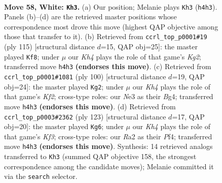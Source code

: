 \documentclass[11pt]{article}
\begin{document}
\clearpage

\begin{figure}[p]\centering
\begin{subfigure}{0.46\textwidth}\centering
\resizebox{\linewidth}{!}{%
\newchessgame
\chessboard[
  setfen={7k/1r4b1/6R1/8/2P4K/4N3/R7/8 w - - 36 58},
  showmover=false,
  pgfstyle=straightmove, color=movearrow, markmove={h4-h3}
]}
\caption{}
\end{subfigure}\hfill
\begin{subfigure}{0.46\textwidth}\centering
\resizebox{\linewidth}{!}{%
\newchessgame
\chessboard[
  setfen={8/6k1/1p1rB3/5K2/8/8/8/R7 b - - 6 58},
  showmover=false,
  pgfstyle=straightmove, color=movearrow, markmove={g7-f8}
]}
\caption{}
\end{subfigure}
\\[4pt]
\begin{subfigure}{0.46\textwidth}\centering
\resizebox{\linewidth}{!}{%
\newchessgame
\chessboard[
  setfen={8/8/5k2/3Rb3/r5B1/7P/5K2/8 w - - 11 51},
  showmover=false,
  pgfstyle=straightmove, color=movearrow, markmove={f2-g2}
]}
\caption{}
\end{subfigure}\hfill
\begin{subfigure}{0.46\textwidth}\centering
\resizebox{\linewidth}{!}{%
\newchessgame
\chessboard[
  setfen={R7/8/5k2/8/5p2/Br6/8/K7 b - - 6 62},
  showmover=false,
  pgfstyle=straightmove, color=movearrow, markmove={f6-g6}
]}
\caption{}
\end{subfigure}
\caption{\textbf{Move 58, White: \texttt{Kh3}.} (a) Our position; Melanie plays \texttt{Kh3} (\texttt{h4h3}). Panels (b)--(d) are the retrieved master positions whose correspondence most drove this move (highest QAP objective among those that transfer to it). (b) Retrieved from \texttt{ccrl\_top\_p0001\#19} (ply 115) [structural distance $d$=15, QAP obj=25]: the master played \texttt{Kf8}; under $\mu$ our \emph{Kh4} plays the role of that game's \emph{Kg2}; transferred move \texttt{h4h3} \textbf{(endorses this move)}. (c) Retrieved from \texttt{ccrl\_top\_p0001\#1081} (ply 100) [structural distance $d$=19, QAP obj=24]: the master played \texttt{Kg2}; under $\mu$ our \emph{Kh4} plays the role of that game's \emph{Kf2}; cross-type roles: our \emph{N}e3 as their \emph{B}g4; transferred move \texttt{h4h3} \textbf{(endorses this move)}. (d) Retrieved from \texttt{ccrl\_top\_p0003\#2362} (ply 123) [structural distance $d$=17, QAP obj=20]: the master played \texttt{Kg6}; under $\mu$ our \emph{Kh4} plays the role of that game's \emph{Kf3}; cross-type roles: our \emph{R}a2 as their \emph{P}f4; transferred move \texttt{h4h3} \textbf{(endorses this move)}. Synthesis: 14 retrieved analogs transferred to \texttt{Kh3} (summed QAP objective 158, the strongest correspondence among the candidate moves); Melanie committed it via the \texttt{search} selector.}
\label{fig:thought-m114}
\end{figure}
\end{document}
